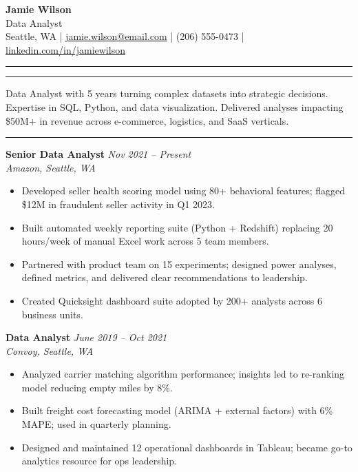 \documentclass[11pt,a4paper]{article}
\newcommand{\sectionbar}[1]{%
  \vspace{6pt}%
  \noindent\textcolor{bar}{\rule{3pt}{14pt}}%
  \hspace{4pt}{\large\textbf{#1}}%
  \vspace{4pt}%
}
\begin{document}
\begin{center}
  {\LARGE \textbf{Jamie Wilson}}\\[3pt]
  \textcolor{bar}{Data Analyst}\\[4pt]
  Seattle, WA \quad|\quad
  \href{mailto:jamie.wilson@email.com}{jamie.wilson@email.com} \quad|\quad
  (206) 555-0473 \quad|\quad
  \href{https://linkedin.com/in/jamiewilson}{linkedin.com/in/jamiewilson}
\end{center}

\noindent\rule{\textwidth}{0.3pt}

\sectionbar{Summary}

\noindent Data Analyst with 5 years turning complex datasets into strategic decisions. Expertise in SQL, Python, and data visualization. Delivered analyses impacting \$50M+ in revenue across e-commerce, logistics, and SaaS verticals.

\sectionbar{Experience}

\noindent\textbf{Senior Data Analyst} \hfill \textit{Nov 2021 -- Present}\\
\textit{Amazon, Seattle, WA}
\begin{itemize}
  \item Developed seller health scoring model using 80+ behavioral features; flagged \$12M in fraudulent seller activity in Q1 2023.
  \item Built automated weekly reporting suite (Python + Redshift) replacing 20 hours/week of manual Excel work across 5 team members.
  \item Partnered with product team on 15 experiments; designed power analyses, defined metrics, and delivered clear recommendations to leadership.
  \item Created Quicksight dashboard suite adopted by 200+ analysts across 6 business units.
\end{itemize}

\vspace{4pt}
\noindent\textbf{Data Analyst} \hfill \textit{June 2019 -- Oct 2021}\\
\textit{Convoy, Seattle, WA}
\begin{itemize}
  \item Analyzed carrier matching algorithm performance; insights led to re-ranking model reducing empty miles by 8\%.
  \item Built freight cost forecasting model (ARIMA + external factors) with 6\% MAPE; used in quarterly planning.
  \item Designed and maintained 12 operational dashboards in Tableau; became go-to analytics resource for ops leadership.
\end{itemize}
\end{document}
